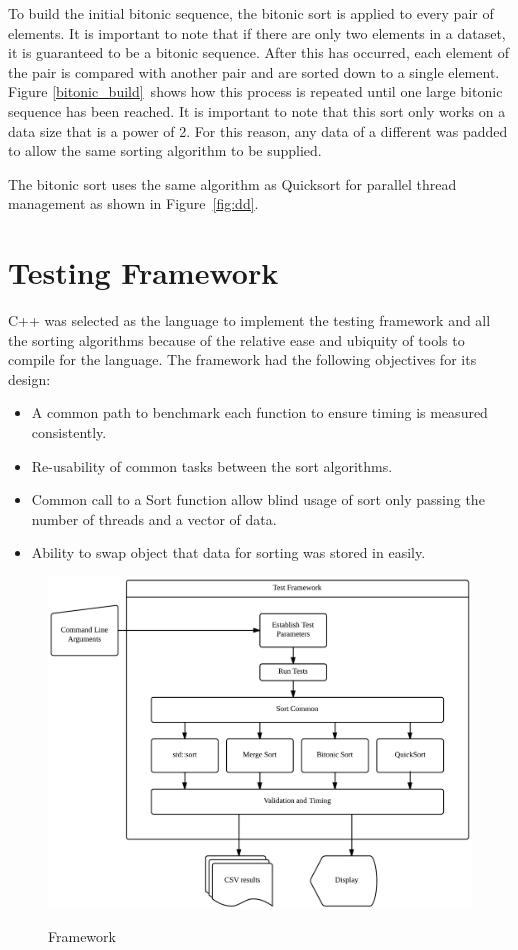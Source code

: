 \documentclass[journal]{IEEEtran}
\begin{document}
To build the initial bitonic sequence, the bitonic sort is applied to every pair of elements.  It is important to note that if there are only two elements in a dataset, it is guaranteed to be a bitonic sequence.  After this has occurred, each element of the pair is compared with another pair and are sorted down to a single element.  Figure \ref{bitonic_build}~shows how this process is repeated until one large bitonic sequence has been reached.  It is important to note that this sort only works on a data size that is a power of 2.  For this reason, any data of a different was padded to allow the same sorting algorithm to be supplied.

The bitonic sort uses the same algorithm as Quicksort for parallel thread management as shown in Figure~\ref{fig:dd}.

\section{Testing Framework}
\label{sec:testing}

C++ was selected as the language to implement the testing framework and all the sorting algorithms because of the relative ease and ubiquity of tools to compile for the language. The framework had the following objectives for its design:

\begin{itemize}
\item A common path to benchmark each function to ensure timing is measured consistently.
\item Re-usability of common tasks between the sort algorithms.
\item Common call to a Sort function allow blind usage of sort only passing the number of threads and a vector of data.
\item Ability to swap object that data for sorting was stored in easily.
\end{itemize}

\begin{figure}[t]
  \caption{Framework}
  \centering
  \includegraphics[width=.75\textwidth]{framework.png}
  \label{fig:framework}
\end{figure}
\end{document}
